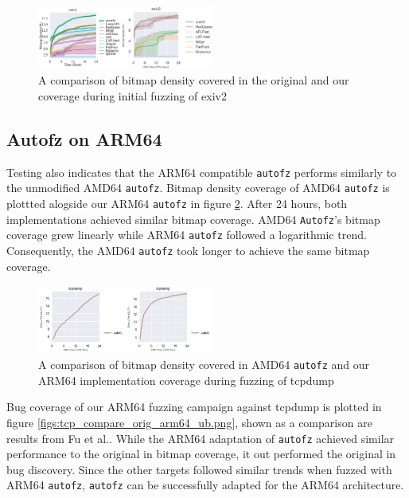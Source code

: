 \begin{figure}
    \includegraphics[width=0.52\textwidth]{figs/exiv2_compare_orig_arm64.png}
    \centering
    \caption{A comparison of bitmap density covered in the original\cite{fu_autofz_2023} and our 
    coverage during initial fuzzing of exiv2}
    \label{fig:exiv2_compare_orig_arm64}
\end{figure}

\subsection{Autofz on ARM64}

Testing also indicates that the ARM64 compatible \texttt{autofz} performs similarly to the unmodified AMD64 \texttt{autofz}. 
Bitmap density coverage of AMD64 \texttt{autofz} is plottted alogside our ARM64 \texttt{autofz} in figure 
\ref{fig:tcpdump_compare_orig_arm64}. After 24 hours, both implementations achieved similar bitmap coverage.
AMD64 \texttt{Autofz}'s bitmap coverage grew linearly while ARM64 \texttt{autofz} followed a logarithmic trend. Consequently, 
the AMD64 \texttt{autofz} took longer to achieve the same bitmap coverage. 

\begin{figure}
    \includegraphics[width=0.52\textwidth]{figs/tcpdump_compare_orig_arm64.png}
    \centering
    \caption{A comparison of bitmap density covered in AMD64 \texttt{autofz} and our ARM64 implementation
    coverage during fuzzing of tcpdump}
    \label{fig:tcpdump_compare_orig_arm64}
\end{figure}

Bug coverage of our ARM64 fuzzing campaign against tcpdump is plotted in figure \ref{figs:tcp_compare_orig_arm64_ub.png}, 
shown as a comparison are results from Fu et al.\cite{fu_autofz_2023}. While the ARM64 adaptation of \texttt{autofz} achieved similar
performance to the original in bitmap coverage, it out performed the original in bug discovery. Since the other targets followed similar trends
when fuzzed with ARM64 \texttt{autofz}, \texttt{autofz} can be successfully adapted for the ARM64 architecture.

